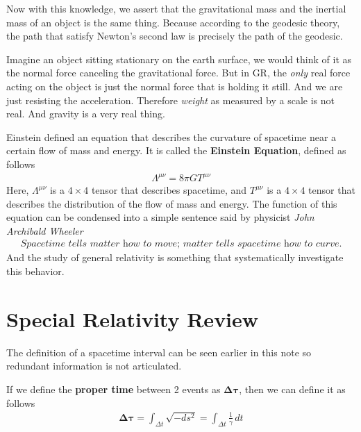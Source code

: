 \documentclass[11pt,letterpaper]{book}
\begin{document}
Now with this knowledge, we assert that the gravitational mass and the inertial mass of an object is the same thing. Because according to the geodesic theory, the path that satisfy Newton's second law is precisely the path of the geodesic. 

Imagine an object sitting stationary on the earth surface, we would think of it as the normal force canceling the gravitational force. But in GR, the \textit{only} real force acting on the object is just the normal force that is holding it still. And we are just resisting the acceleration. Therefore \textit{weight} as measured by a scale is not real. And gravity is a very real thing. 

Einstein defined an equation that describes the curvature of spacetime near a certain flow of mass and energy. It is called the \textbf{Einstein Equation}, defined as follows
\begin{align}
\Lambda^{\mu\nu} = 8\pi GT^{\mu\nu}
\end{align}
Here, $\Lambda^{\mu\nu}$ is a $4\times4$ tensor that describes spacetime, and $T^{\mu\nu}$ is a $4\times4$ tensor that describes the distribution of the flow of mass and energy. The function of this equation can be condensed into a simple sentence said by physicist \textit{John Archibald Wheeler}
\begin{align}
\textit{Spacetime tells matter how to move; matter tells spacetime how to curve.}
\end{align}
And the study of general relativity is something that systematically investigate this behavior. 


\section{Special Relativity Review}
The definition of a spacetime interval can be seen earlier in this note so redundant information is not articulated. 

If we define the \textbf{proper time} between 2 events as $\boldsymbol\Delta\boldsymbol\tau$, then we can define it as follows
\begin{align}
\boldsymbol\Delta\boldsymbol\tau = \int_{\Delta t }\sqrt{-ds^2} =\int_{\Delta t} \frac{1}{\gamma}\,dt
\end{align}
\end{document}
